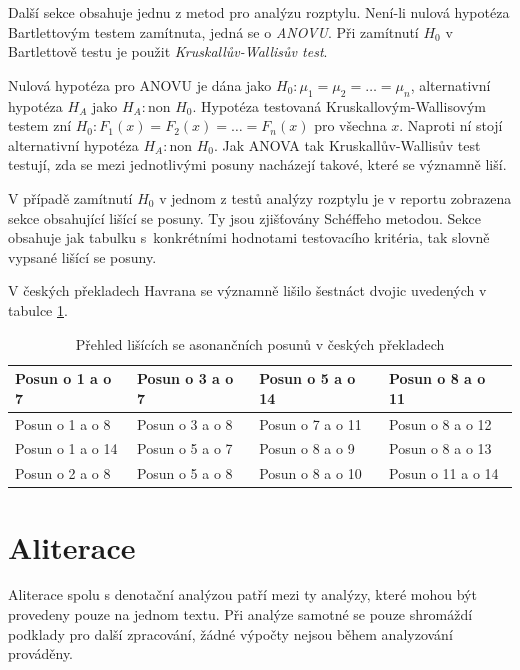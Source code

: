 \documentclass[dp.tex]{subfiles}
\begin{document}
Další sekce obsahuje jednu z metod pro analýzu rozptylu. Není-li nulová hypotéza Bartlettovým testem zamítnuta, jedná se o \textit{ANOVU}. Při zamítnutí $H_0$ v Bartlettově testu je použit \textit{Kruskallův-Wallisův test}.

Nulová hypotéza pro ANOVU je dána jako $H_0: \mu_1 = \mu_2 = \dots = \mu_n$, alternativní hypotéza $H_A$ jako $H_A:  \mbox{non } H_0$. Hypotéza testovaná Kruskallovým-Wallisovým testem zní $H_0: F_1(x) = F_2(x) = \dots = F_n(x)$ pro všechna $x$. Naproti ní stojí alternativní hypotéza $H_A: \mbox{non } H_0$. Jak ANOVA tak Kruskallův-Wallisův test testují, zda se mezi jednotlivými posuny nacházejí takové, které se významně liší.

V případě zamítnutí $H_0$ v jednom z testů analýzy rozptylu je v reportu zobrazena sekce obsahující lišící se posuny. Ty jsou zjišťovány Schéffeho metodou. Sekce obsahuje jak tabulku s~konkrétními hodnotami testovacího kritéria, tak slovně vypsané lišící se posuny.

V českých překladech Havrana se významně lišilo šestnáct dvojic uvedených v tabulce \ref{tab:asonance-lisici-se}.
\begin {table}[H]
	\caption {Přehled lišících se asonančních posunů v českých překladech} 
	\label{tab:asonance-lisici-se} 

	\begin{center}
		\begin{tabular}{|l|l|l|l|}
		\hline Posun o 1 a o 7   & Posun o 3 a o 7 & Posun o 5 a o 14 & Posun o 8 a o 11  \\ 
		\hline Posun o 1 a o 8   & Posun o 3 a o 8 & Posun o 7 a o 11 & Posun o 8 a o 12  \\ 
		\hline Posun o 1 a o 14  & Posun o 5 a o 7 & Posun o 8 a o 9  & Posun o 8 a o 13  \\ 
		\hline Posun o 2 a o 8   & Posun o 5 a o 8 & Posun o 8 a o 10 & Posun o 11 a o 14 \\ 
		\hline 
		\end{tabular} 
	\end{center}
\end{table}

\section{Aliterace}

Aliterace spolu s denotační analýzou patří mezi ty analýzy, které mohou být provedeny pouze na jednom textu. Při analýze samotné se pouze shromáždí podklady pro další zpracování, žádné výpočty nejsou během analyzování prováděny.
\end{document}
